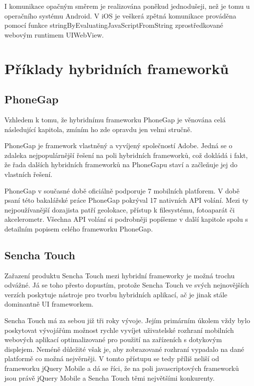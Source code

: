 I komunikace opačným směrem je realizována poněkud jednodušeji, než je tomu u operačního systému Android. V iOS je veškerá zpětná komunikace prováděna pomocí funkce stringByEvaluatingJavaScriptFromString zprostředkované webovým runtimem UIWebView. \cite{dissecting_phonegap_architecture}

\section{Příklady hybridních frameworků}
\subsection{PhoneGap}
Vzhledem k tomu, že hybridnímu frameworku PhoneGap je věnována celá následující kapitola, zmíním ho zde opravdu jen velmi stručně.

PhoneGap je framework vlastněný a vyvíjený společností Adobe. Jedná se o zdaleka nejpopulárnější řešení na poli hybridních frameworků, což dokládá i fakt, že řada dalších hybridních frameworků na PhoneGapu staví a začleňuje jej do vlastních řešení.

PhoneGap v současné době oficiálně podporuje 7 mobilních platforem. V době psaní této bakalářské práce PhoneGap pokrýval 17 nativních API volání. Mezi ty nejpoužívanější dozajista patří geolokace, přístup k filesystému, fotoaparát či akcelerometr. Všechna API volání si podrobněji popíšeme v další kapitole spolu s detailním popisem celého frameworku PhoneGap.

\subsection{Sencha Touch}
Zařazení produktu Sencha Touch mezi hybridní frameworky je možná trochu odvážné. Já se toho přesto dopustím, protože Sencha Touch ve svých nejnovějších verzích poskytuje nástroje pro tvorbu hybridních aplikací, ač je jinak stále dominantně UI frameworkem.

Sencha Touch má za sebou již tři roky vývoje. Jejím primárním úkolem vždy bylo poskytovat vývojářům možnost rychle vyvíjet uživatelské rozhraní mobilních webových aplikací optimalizované pro použití na zařízeních s dotykovým displejem. Neméně důležité však je, aby zobrazované rozhraní vypadalo na dané platformě co možná nejvěrněji. V tomto přístupu se tedy příliš neliší od frameworku jQuery Mobile a dá se říci, že na poli javascriptových frameworků jsou právě jQuery Mobile a Sencha Touch těmi největšími konkurenty.

